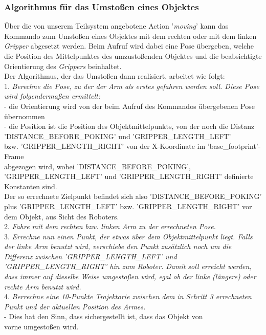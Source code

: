 \documentclass{suturo}
\newcommand\tab[1][1cm]{\hspace*{#1}}
\begin{document}
\subsubsection{Algorithmus für das Umstoßen eines Objektes}
Über die von unserem Teilsystem angebotene Action '\textit{moving}' kann das Kommando zum Umstoßen eines Objektes mit dem rechten oder mit dem linken \textit{Gripper} abgesetzt werden. Beim Aufruf wird dabei eine Pose übergeben, welche die Position des Mittelpunktes des umzustoßenden Objektes und die beabsichtigte Orientierung des \textit{Grippers} beinhaltet. \\Der Algorithmus, der das Umstoßen dann realisiert, arbeitet wie folgt:\\

1. \textit{Berechne die Pose, zu der der Arm als erstes gefahren werden soll. Diese Pose wird folgendermaßen ermittelt:}\\
\tab - die Orientierung wird von der beim Aufruf des Kommandos übergebenen Pose übernommen\\
\tab - die Position ist die Position des Objektmittelpunkts, von der noch die Distanz\\ \tab   'DISTANCE\_BEFORE\_POKING' und 'GRIPPER\_LENGTH\_LEFT'\\ \tab bzw. 'GRIPPER\_LENGTH\_RIGHT' von der X-Koordinate im 'base\_footprint'-Frame \\ \tab abgezogen wird, wobei 'DISTANCE\_BEFORE\_POKING', 'GRIPPER\_LENGTH\_LEFT' \tab und 'GRIPPER\_LENGTH\_RIGHT' definierte Konstanten sind.\\

Der so errechnete Zielpunkt befindet sich also 'DISTANCE\_BEFORE\_POKING' plus 'GRIPPER\_LENGTH\_LEFT' bzw. 'GRIPPER\_LENGTH\_RIGHT' vor dem Objekt, aus Sicht des Roboters.\\

2. \textit{Fahre mit dem rechten bzw. linken Arm zu der errechneten Pose.}\\

3. \textit{Errechne nun einen Punkt, der etwas über dem Objektmittelpunkt liegt. Falls der linke Arm benutzt wird, verschiebe den Punkt zusätzlich noch um die Differenz zwischen 'GRIPPER\_LENGTH\_LEFT' und 'GRIPPER\_LENGTH\_RIGHT' hin zum Roboter. Damit soll erreicht werden, dass immer auf dieselbe Weise umgestoßen wird, egal ob der linke (längere) oder rechte Arm benutzt wird.}\\

4. \textit{Berrechne eine 10-Punkte Trajektorie zwischen dem in Schritt 3 errechneten Punkt und der aktuellen Position des Armes.}\\
\tab - Dies hat den Sinn, dass sichergestellt ist, dass das Objekt von\\ \tab vorne umgestoßen wird.\\
\end{document}
